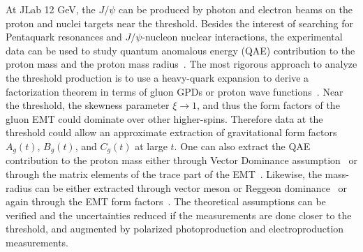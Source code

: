 At JLab 12 GeV, the $J/\psi$ can be produced by photon and electron beams on the proton and nuclei targets near the threshold. Besides the interest of searching for Pentaquark resonances and $J/\psi$-nucleon nuclear interactions, the experimental data can be used to study quantum anomalous energy (QAE) contribution to the proton mass and the proton mass radius~\cite{Ji:2021mtz,Kharzeev:2021qkd,Mamo:2021krl}. The most rigorous approach to analyze the threshold production is to use a heavy-quark expansion to derive a factorization theorem in terms of gluon GPDs or proton wave functions~\cite{Guo:2021ibg, Sun:2021gmi,Sun:2021pyw}. Near the threshold, the skewness parameter $\xi\to 1$, and thus the form factors of the gluon EMT could dominate over other higher-spins. Therefore data at the threshold could allow an approximate extraction of gravitational form factors $A_g(t)$, $B_g(t)$, and $C_g(t)$ at large $t$. One can also extract the QAE contribution to the 
proton mass either through Vector Dominance assumption~\cite{Kou:2021bez} or through the matrix elements of the trace part of the EMT~\cite{Ji:2021mtz}. Likewise, the mass-radius can be either extracted through vector meson or Reggeon dominance~\cite{Kharzeev:2021qkd,Mamo:2021krl,Wang:2021dis} or again through the EMT form factors~\cite{Ji:2021mtz,Guo:2021ibg}. The theoretical assumptions can be verified and the uncertainties reduced if the measurements are done closer to the threshold, and augmented by polarized photoproduction and electroproduction measurements. 

\iffalse
\begin{figure}
\begin{center}
\texttt{[image: Figures/total\_tdist-xsec-zm.pdf]}
\caption{Projected total threshold cross section (left) and differential cross section at function of $t$ at $E_\gamma\sim$ 9.5 GeV (right) for $J/\psi$ production with SoLID detector.}
\label{fig:crosssection} 
\end{center}
\end{figure}
\fi

